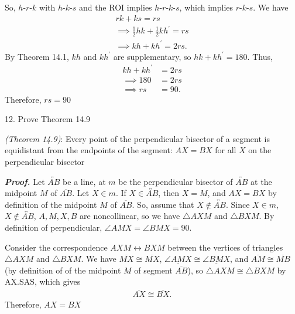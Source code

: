 \documentclass{report}
\begin{document}
    \bigbreak \noindent 
    So, $ h\text{-}r\text{-}k $ with $ h\text{-}k\text{-}s$ and the ROI implies $ h\text{-}r\text{-}k\text{-}s$, which implies $ r\text{-}k\text{-}s$. We have
    \begin{align*}
        rk + ks = rs \\
        \implies \frac{1}{2}hk + \frac{1}{2}kh^{\prime} = rs \\
        \implies kh + kh^{\prime} = 2rs
    .\end{align*}
    By Theorem 14.1, $kh$ and $kh^{\prime}$ are supplementary, so $ hk + kh^{\prime} = 180$. Thus,
    \begin{align*}
        kh + kh^{\prime} &= 2rs \\
        \implies 180 &= 2rs \\
        \implies rs &= 90
    .\end{align*}
    Therefore, $ rs = 90$ \endpf

    \bigbreak \noindent 
    \begin{mdframed}
        12. Prove Theorem 14.9
    \end{mdframed}
    \bigbreak \noindent 
    \begin{remark}
        \textit{(Theorem 14.9)}: Every point of the perpendicular bisector of a segment is equidistant from the endpoints of the segment: $AX = BX$ for all $X$ on the perpendicular bisector
    \end{remark}
    \bigbreak \noindent 
    \textbf{\textit{Proof.}} Let $ \overleftrightarrow{AB}$ be a line, at $m$ be the perpendicular bisector of $ \overleftrightarrow{AB}$ at the midpoint $M$ of $\overline{AB}$. Let $X \in m$.
    \bigbreak \noindent 
    If $X \in \overleftrightarrow{AB}$, then $X = M$, and $AX = BX$ by definition of the midpoint $M$ of $\overline{AB}$. So, assume that $X \not\in \overleftrightarrow{AB}$.
    \bigbreak \noindent 
    Since $X \in m$, $X \not\in \overleftrightarrow{AB}$, $A,M,X,B$ are noncollinear, so we have $ \triangle AXM$ and $\triangle BXM$. By definition of perpendicular, $ \angle AMX = \angle BMX = 90$.
    \pagebreak \bigbreak \noindent 
    \begin{figure}[ht]
        \centering
        \label{fig:tri}
    \end{figure}
    \bigbreak \noindent 
    Consider the correspondence $AXM \leftrightarrow BXM$ between the vertices of triangles $\triangle AXM$ and $ \triangle BXM$. We have $\overline{MX} \cong \overline{MX}$, $\underline{\angle  AMX} \cong \underline{\angle BMX}$, and $ \overline{AM} \cong \overline{MB}$ (by definition of of the midpoint $M$ of segment $\overline{AB}$), so $ \triangle AXM \cong \triangle BXM$ by AX.SAS, which gives 
    \begin{align*}
        \overline{AX} \cong \overline{BX}
    .\end{align*}
    Therefore, $AX = BX$ \endpf
\end{document}
